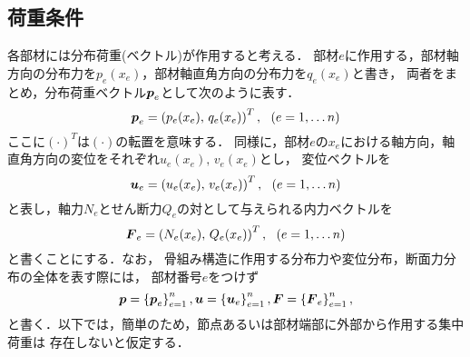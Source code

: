 \documentclass[10pt,a4j]{jarticle}
\begin{document}
\subsection{荷重条件}
各部材には分布荷重(ベクトル)が作用すると考える．
部材$e$に作用する，部材軸方向の分布力を$p_e(x_e)$，部材軸直角方向の分布力を$q_e(x_e)$と書き，
両者をまとめ，分布荷重ベクトル$\mbox{\boldmath $p$}_e$として次のように表す．
\begin{equation}
	\mbox{\boldmath $p$}_e=\left( p_e(x_e),\, q_e(x_e) \right)^T, \ \ (e=1,\dots n)
	\label{eqn:}
\end{equation}
ここに$(\cdot)^T$は$(\cdot)$の転置を意味する．
同様に，部材$e$の$x_e$における軸方向，軸直角方向の変位をそれぞれ$u_e(x_e),\, v_e(x_e)$とし，
変位ベクトルを
\begin{equation}
	\mbox{\boldmath $u$}_e=\left( u_e(x_e),\, v_e(x_e) \right)^T,  \ \ (e=1,\dots n)
	\label{eqn:}
\end{equation}
と表し，軸力$N_e$とせん断力$Q_e$の対として与えられる内力ベクトルを
\begin{equation}
	\mbox{\boldmath $F$}_e=\left( N_e(x_e),\, Q_e(x_e) \right)^T,  \ \ (e=1,\dots n)
	\label{eqn:}
\end{equation}
と書くことにする．なお，
骨組み構造に作用する分布力や変位分布，断面力分布の全体を表す際には，
部材番号$e$をつけず
\begin{equation}
	\mbox{\boldmath $p$}=\left\{ \mbox{\boldmath $p$}_e \right\}_{e=1}^n, 
	\\
	\mbox{\boldmath $u$}=\left\{ \mbox{\boldmath $u$}_e \right\}_{e=1}^n, 
	\\
	\mbox{\boldmath $F$}=\left\{ \mbox{\boldmath $F$}_e \right\}_{e=1}^n,
	\label{eqn:}
\end{equation}
と書く．以下では，簡単のため，節点あるいは部材端部に外部から作用する集中荷重は
存在しないと仮定する．
\end{document}
